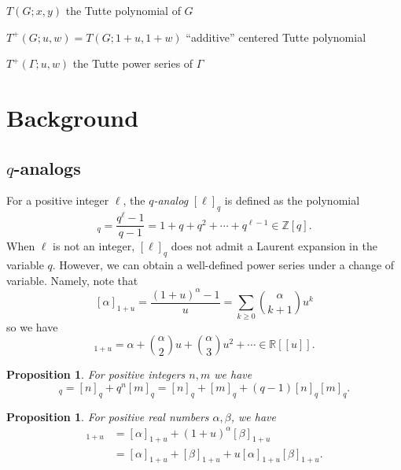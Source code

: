 \documentclass{amsart}
\newtheorem{prop}[thm]{Proposition}
\theoremstyle{definition}
\newcommand{\RR}{\mathbb{R}}
\newcommand{\ZZ}{\mathbb{Z}}
\begin{document}
$T(G; x,y)$ the Tutte polynomial of $G$

$T^+(G; u,w) = T(G; 1+u,1+w)$ ``additive'' centered Tutte polynomial

$T^+(\Gamma; u,w)$ the Tutte power series of $\Gamma$




\section{Background}

\subsection{$q$-analogs}
For a positive integer $\ell$,
the {\em $q$-analog}
$[\ell]_q$ is defined as
the polynomial
\begin{equation*}
[\ell]_q = \frac{q^\ell - 1}{q - 1}
= 1 + q + q^2 + \cdots + q^{\ell -1} 
\in \ZZ[q].
\end{equation*}
When $\ell$ is not an integer, 
$[\ell]_q$ does not admit a Laurent expansion in the variable $q$.
However, we can obtain a well-defined power series under a change of variable.
Namely, note that
\[ [\alpha]_{1+u} = \frac{(1+u)^\alpha - 1}{u}
= \sum_{k \geq 0} \binom{\alpha}{k+1}u^{k} 
\]
so we have 
\begin{equation}
[\alpha]_{1+u} = \alpha + \binom{\alpha}{2} u + \binom{\alpha}{3} u^2 + \cdots
\in \RR[[u]] .
\end{equation}

\begin{prop}
For positive integers $n,m$ we have
\begin{equation*}
[n + m]_q =  [n ]_q + q^{n} [m]_q
 = [n]_q + [m]_q + (q-1) [n]_q [m]_q .
\end{equation*}
\end{prop}
\begin{prop}
For positive real numbers $\alpha,\beta$, we have
\begin{align*}
[\alpha + \beta]_{1+u} &=  [\alpha]_{1+u} + (1+u)^{\alpha} [\beta]_{1+u} \\
 &= [\alpha]_{1+u} + [\beta]_{1+u} + u [\alpha]_{1+u} [\beta]_{1+u}.
\end{align*}
\end{prop}
\end{document}
